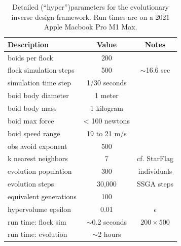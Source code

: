 \documentclass[letterpaper]{article}
\begin{document}
\begin{table}[t]
\centering
\begin{tabular}{ | l | c | c | }
    \hline
    \textbf{Description} & \textbf{Value} & \textbf{Notes} \\
    \hline
    boids per flock & 200 &  \\
    flock simulation steps & 500 & $\sim$16.6 sec \\
    simulation time step & 1/30 seconds & \\
    \hline
    boid body diameter & 1 meter & \\
    boid body mass & 1 kilogram & \\
    boid max force & < 100 newtons & \\
    boid speed range & 19 to 21 m/s & \\
    obs avoid exponent & 500 & \\
    k nearest neighbors & 7 & cf. StarFlag \\
    \hline
    evolution population & 300 & individuals \\
    evolution steps & 30,000 &  SSGA steps \\
    equivalent generations & 100 & \\
    hypervolume epsilon & 0.01 & $\epsilon$ \\
    \hline
    run time: flock sim & $\sim$0.2 seconds & $200{\times}500$ \\
    run time: evolution & $\sim$2 hours & \\
    \hline
\end{tabular}
\caption{Detailed (``hyper'')parameters for the evolutionary inverse design framework. Run times are on a 2021 Apple Macbook Pro M1 Max.}
\label{table:HyperParameters}
\end{table}
\end{document}
